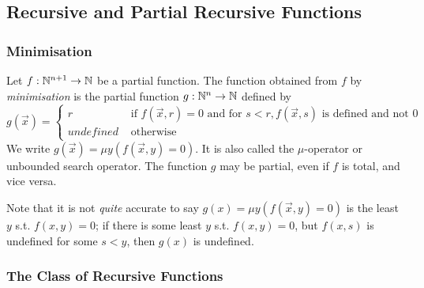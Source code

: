 \newpage

\subsection{Recursive and Partial Recursive Functions}

\subsubsection{Minimisation}

Let $ f: \mathbb{N}^{n+1} \to \mathbb{N} $ be a partial function. The function obtained from $ f $ by \textit{minimisation} is the partial function $ g: \mathbb{N}^n \to \mathbb{N} $ defined by
\begin{equation*}
g(\vec{x}) = \begin{cases}
r &\text{ if } f(\vec{x}, r) = 0 \text{ and for } s < r, f(\vec{x}, s) \text{ is defined and not 0}\\
\textit{undefined} &\text{ otherwise}
\end{cases}
\end{equation*}
We write $ g(\vec{x}) = \mu y (f(\vec{x}, y) = 0) $. It is also called the $ \mu $-operator or unbounded search operator. The function $ g $ may be partial, even if $ f $ is total, and vice versa.

Note that it is not \textit{quite} accurate to say $ g(x) = \mu y (f(\vec{x}, y) = 0) $ is the least $ y $ s.t. $ f(x, y) = 0 $; if there is some least $ y $ s.t. $ f(x, y) = 0 $, but $ f(x, s) $ is undefined for some $ s < y $, then $ g(x) $ is undefined.

\subsubsection{The Class of Recursive Functions}

